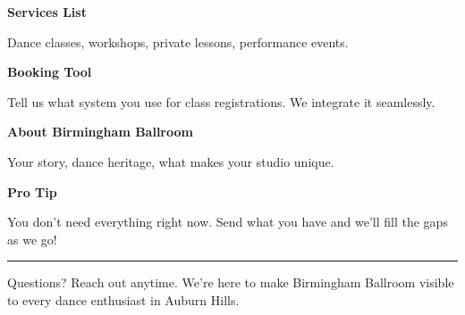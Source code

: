 \documentclass[11pt,letterpaper]{article}
\begin{document}
\begin{minipage}[t]{0.48\textwidth}
\begin{tcolorbox}[colframe=accent-teal, boxrule=1pt, left=0.7em, right=0.7em, top=0.5em, bottom=0.5em, arc=4pt, boxsep=0pt]
{\bfseries\small\color{accent-teal}Services List}

\vspace{0.15em}

{\small Dance classes, workshops, private lessons, performance events.}
\end{tcolorbox}

\vspace{0.1em}

\begin{tcolorbox}[colframe=accent-teal, boxrule=1pt, left=0.7em, right=0.7em, top=0.5em, bottom=0.5em, arc=4pt, boxsep=0pt]
{\bfseries\small\color{accent-teal}Booking Tool}

\vspace{0.15em}

{\small Tell us what system you use for class registrations. We integrate it seamlessly.}
\end{tcolorbox}

\vspace{0.1em}

\begin{tcolorbox}[colframe=accent-teal, boxrule=1pt, left=0.7em, right=0.7em, top=0.5em, bottom=0.5em, arc=4pt, boxsep=0pt]
{\bfseries\small\color{accent-teal}About Birmingham Ballroom}

\vspace{0.15em}

{\small Your story, dance heritage, what makes your studio unique.}
\end{tcolorbox}

\vspace{-0.2em}
\end{minipage}

\vspace{0.15em}

\begin{tcolorbox}[colback={accent-red!5}, colframe=accent-red!20, boxrule=0.5pt, left=0.7em, right=0.7em, top=0.4em, bottom=0.4em, arc=6pt, boxsep=0pt]

{\bfseries\small\color{accent-red}Pro Tip}

\vspace{0.1em}

{\small You don't need everything right now. Send what you have and we'll fill the gaps as we go!}

\end{tcolorbox}

\vspace{0.15em}

\noindent\hrule
\vspace{0.2em}

{\small\color{text-light}Questions? Reach out anytime. We're here to make Birmingham Ballroom visible to every dance enthusiast in Auburn Hills.}
\end{document}
